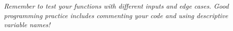 \documentclass[oneside]{article}
\begin{document}
%
%
%
%
%
%
%
%

\noindent \textit{Remember to test your functions with different inputs and edge cases.
Good programming practice includes commenting your code and using descriptive variable
names!}
\end{document}
